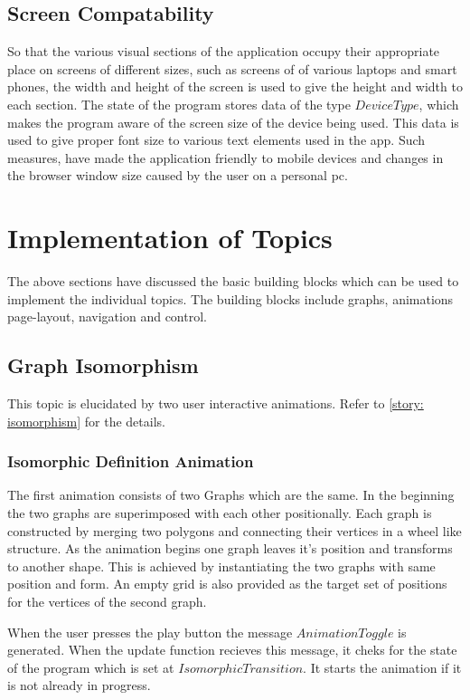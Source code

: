 \subsection{Screen Compatability}
So that the various visual sections of the application occupy their appropriate
place on screens of different sizes, such as screens of of various laptops and
smart phones, the width and height of the screen is used to give the height and
width to each section.  
The state of the program stores data of the type $DeviceType$, which makes the
program aware of the screen size of the device being used. This data is used to
give proper font size to various text elements used in the app. Such measures,
have made the application friendly to mobile devices and changes in the browser
window size caused by the user on a personal pc.

\section{Implementation of Topics}
The above sections have discussed the basic building blocks which can be used
to implement the individual topics. The building blocks include graphs, animations
page-layout, navigation and control.

\subsection{Graph Isomorphism}
\label{impl: isomporphism}

This topic is elucidated by two user interactive animations. Refer to
\autoref{story: isomorphism} for the details. 


\subsubsection{Isomorphic Definition Animation}
The first animation consists of two Graphs which are the same.  In the
beginning the two graphs are superimposed with each other positionally.  Each
graph is constructed by merging two polygons and connecting their vertices in a
wheel like structure. As the animation begins one graph leaves it's position
and transforms to another shape.  This is achieved by instantiating the two
graphs with same position and form. An empty grid is also provided as the
target set of positions for the vertices of the second graph. 

When the user presses the play button the message $AnimationToggle$ is
generated. When the update function recieves this message, it cheks for the
state of the program which is set at $IsomorphicTransition$. It starts the
animation if it is not already in progress.  

